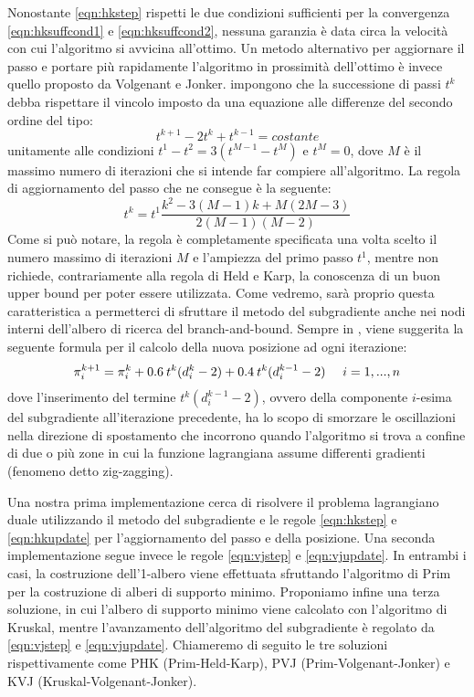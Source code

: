 Nonostante \ref{eqn:hkstep} rispetti le due condizioni sufficienti per la convergenza \ref{eqn:hksuffcond1} e \ref{eqn:hksuffcond2}, nessuna garanzia è data circa la velocità con cui l'algoritmo si avvicina all'ottimo. Un metodo alternativo per aggiornare il passo e portare più rapidamente l'algoritmo in prossimità dell'ottimo è invece quello proposto da Volgenant e Jonker. \citet*{volgenant1982branch} impongono che la successione di passi $t^k$ debba rispettare il vincolo imposto da una equazione alle differenze del secondo ordine del tipo: 
\begin{equation}
t^{k+1} - 2 t^k + t^{k-1} = costante
\end{equation}
unitamente alle condizioni $t^1 - t^2 = 3(t^{M-1} - t^M)$ e $t^M = 0$, dove $M$ è il massimo numero di iterazioni che si intende far compiere all'algoritmo. La regola di aggiornamento del passo che ne consegue è la seguente:
\begin{equation}
t^k = t^1 \frac{k^2 - 3 (M - 1) k + M (2 M - 3)}{2 (M - 1) (M - 2)} \label{eqn:vjstep}
\end{equation}
Come si può notare, la regola è completamente specificata una volta scelto il numero massimo di iterazioni $M$ e l'ampiezza del primo passo $t^1$, mentre non richiede, contrariamente alla regola di Held e Karp, la conoscenza di un buon upper bound per poter essere utilizzata. Come vedremo, sarà proprio questa caratteristica a permetterci di sfruttare il metodo del subgradiente anche nei nodi interni dell'albero di ricerca del branch-and-bound. Sempre in \citep{volgenant1982branch}, viene suggerita la seguente formula per il calcolo della nuova posizione ad ogni iterazione:
\begin{align}
\pi^{k+1}_i = \pi^k_i + 0.6 \: t^k (d^k_i - 2) + 0.4 \: t^k (d^{k-1}_i - 2)  \text{\: \: \:} i = 1, ..., n  \label{eqn:vjupdate}
\end{align}
dove l'inserimento del termine $t^k (d^{k-1}_i - 2)$, ovvero della componente $i$-esima del subgradiente all'iterazione precedente, ha lo scopo di smorzare le oscillazioni nella direzione di spostamento che incorrono quando l'algoritmo si trova a confine di due o più zone in cui la funzione lagrangiana assume differenti gradienti (fenomeno detto zig-zagging). 

Una nostra prima implementazione cerca di risolvere il problema lagrangiano duale utilizzando il metodo del subgradiente e le regole \ref{eqn:hkstep} e \ref{eqn:hkupdate} per l'aggiornamento del passo e della posizione. Una seconda implementazione segue invece le regole \ref{eqn:vjstep} e \ref{eqn:vjupdate}. In entrambi i casi, la costruzione dell'1-albero viene effettuata sfruttando l'algoritmo di Prim per la costruzione di alberi di supporto minimo. Proponiamo infine una terza soluzione, in cui l'albero di supporto minimo viene calcolato con l'algoritmo di Kruskal, mentre l'avanzamento dell'algoritmo del subgradiente è regolato da \ref{eqn:vjstep} e \ref{eqn:vjupdate}. Chiameremo di seguito le tre soluzioni rispettivamente come PHK (Prim-Held-Karp), PVJ (Prim-Volgenant-Jonker) e KVJ (Kruskal-Volgenant-Jonker).

